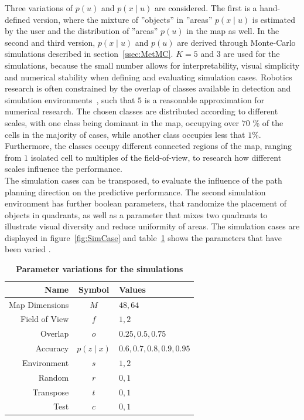 \documentclass[twocolumn,letterpaper]{IEEEAerospaceCLS}  %
\begin{document}
Three variations of $p(u)$ and $p(x\mid u)$ are considered. The first is a hand-defined version, where the mixture of ''objects'' in ''areas'' $p(x\mid u)$ is estimated by the user and the distribution of ''areas'' $p(u)$ in the map as well. In the second and third version, $p(x\mid u)$ and $p(u)$ are derived through Monte-Carlo simulations described in section~\ref{ssec:MetMC}. $K=5$ and $3$ are used for the simulations, because the small number allows for interpretability, visual simplicity and numerical stability when defining and evaluating simulation cases. Robotics research is often constrained by the overlap of classes available in detection and simulation environments~\cite{chaplot_object_2020}, such that $5$ is a reasonable approximation for numerical research. The chosen classes are distributed according to different scales, with one class being dominant in the map, occupying over $70$ \% of the cells in the majority of cases, while another class occupies less that $1$\%. Furthermore, the classes occupy different connected regions of the map, ranging from $1$ isolated cell to multiples of the field-of-view, to research how different scales influence the performance.\\
The simulation cases can be transposed, to evaluate the influence of the path planning direction on the predictive performance. The second simulation environment has further boolean parameters, that randomize the placement of objects in quadrants, as well as a parameter that mixes two quadrants to illustrate visual diversity and reduce uniformity of areas. The simulation cases are displayed in figure~\ref{fig:SimCase} and table~\ref{tab:params} shows the parameters that have been varied .
\begin{table}[]
    \renewcommand{\arraystretch}{1.3}
    \caption{\bf Parameter variations for the simulations}
    \label{tab:params}
    \centering
    \begin{tabular}{|r||c|l|}
        \hline
        \bfseries Name      & \bfseries Symbol & \bfseries Values       \\
        \hline \hline
        Map Dimensions & $M$ & $48, 64$\\
        \hline
        Field of View  & $f$              & $1, 2$ \\
        \hline
        Overlap     & $o$              & $0.25, 0.5, 0.75$         \\
        \hline
        Accuracy & $p(z\mid x)$              & $0.6, 0.7, 0.8, 0.9, 0.95$        \\
        \hline
        Environment & $s$& $1, 2$ \\
        \hline
        Random & $r$ & $0, 1$ \\
        \hline
        Transpose & $t$ & $0, 1$  \\
        \hline
        Test & $c$ & $0, 1$  \\
        \hline
    \end{tabular}
\end{table}
\end{document}

